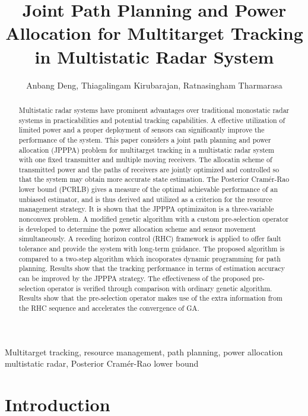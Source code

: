 \documentclass[12pt,journal,draftclsnofoot,onecolumn]{IEEEtran}
\title{Joint Path Planning and Power Allocation for Multitarget Tracking in Multistatic Radar System}
\author{Anbang Deng, Thiagalingam Kirubarajan, Ratnasingham Tharmarasa}
\date{}
\begin{document}
\maketitle

\begin{abstract}
 Multistatic radar systems have prominent advantages over traditional monostatic radar systems in practicabilities and potential tracking capabilities. A effective utilization of limited power and a proper deployment of sensors can significantly improve the performance of the system. This paper considers a joint path planning and power allocation (JPPPA) problem for multitarget tracking in a multistatic radar system with one fixed transmitter and multiple moving receivers. The allocatin scheme of transmitted power and the paths of receivers are jointly optimized and controlled so that the system may obtain more accurate state estimation. The Posterior Cramér-Rao lower bound (PCRLB) gives a measure of the optimal achievable performance of an unbiased estimator, and is thus derived and utilized as a criterion for the resource management strategy. It is shown that the JPPPA optimizaiton is a three-variable nonconvex problem. A modified genetic algorithm with a custom pre-selection operator is developed to determine the power allocation scheme and sensor movement simultaneously. A receding horizon control (RHC) framework is applied to offer fault tolerance and provide the system with long-term guidance. The proposed algorithm is compared to a two-step algorithm which incoporates dynamic programming for path planning. Results show that the tracking performance in terms of estimation accuracy can be improved by the JPPPA strategy. The effectiveness of the proposed pre-selection operator is verified through comparison with ordinary genetic algorithm. Results show that the pre-selection operator makes use of the extra information from the RHC sequence and accelerates the convergence of GA.

    
\end{abstract}

\begin{IEEEkeywords}
Multitarget tracking, resource management, path planning, power allocation multistatic radar, Posterior Cramér-Rao lower bound
\end{IEEEkeywords}


\section{Introduction}
\end{document}

